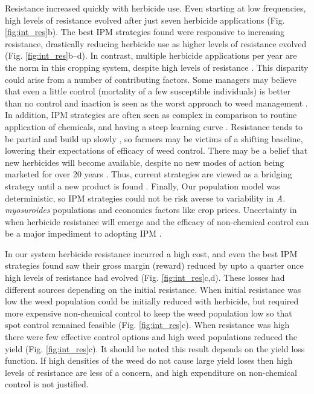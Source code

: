 \documentclass[12pt, a4paper]{article}
\begin{document}
Resistance increased quickly with herbicide use. Even starting at low frequencies, high levels of resistance evolved after just seven herbicide applications (Fig. \ref{fig:int_res}b). The best IPM strategies found were responsive to increasing resistance, drastically reducing herbicide use as higher levels of resistance evolved (Fig. \ref{fig:int_res}b--d). In contrast, multiple herbicide applications per year are the norm in this cropping system, despite high levels of resistance \citep{Hick2018}. This disparity could arise from a number of contributing factors. Some managers may believe that even a little control (mortality of a few susceptible individuals) is better than no control and inaction is seen as the worst approach to weed management \citep{Wils2008}. In addition, IPM strategies are often seen as complex in comparison to routine application of chemicals, and having a steep learning curve \citep{Llew2006}. Resistance tends to be partial and build up slowly \citep{Moss2009, Hull2014}, so farmers may be victims of a shifting baseline, lowering their expectations of efficacy of weed control. There may be a belief that new herbicides will become available, despite no new modes of action being marketed for over 20 years \citep{Duke2012}. Thus, current strategies are viewed as a bridging strategy until a new product is found \citep{Hurl2016}. Finally, Our population model was deterministic, so IPM strategies could not be risk averse to variability in \textit{A. myosuroides} populations and economics factors like crop prices. Uncertainty in when herbicide resistance will emerge and the efficacy of non-chemical control can be a major impediment to adopting IPM \citep{Hurl2016}.     

In our system herbicide resistance incurred a high cost, and even the best IPM strategies found saw their gross margin (reward) reduced by upto a quarter once high levels of resistance had evolved (Fig. \ref{fig:int_res}c,d). These losses had different sources depending on the initial resistance. When initial resistance was low the weed population could be initially reduced with herbicide, but required more expensive non-chemical control to keep the weed population low so that spot control remained feasible (Fig. \ref{fig:int_res}c). When resistance was high there were few effective control options and high weed populations reduced the yield (Fig. \ref{fig:int_res}c). It should be noted this result depends on the yield loss function. If high densities of the weed do not cause large yield loses then high levels of resistance are less of a concern, and high expenditure on non-chemical control is not justified.           
\end{document}
